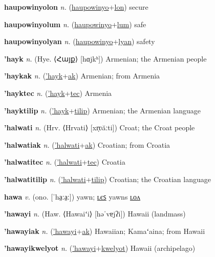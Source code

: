 \textbf{\hypertarget{haupowinyolon}{haupowinyolon}} \textit{n.} (\hyperlink{haupowinyo}{haupowinyo}+\allowbreak \hyperlink{lon}{lon})
secure

\textbf{\hypertarget{haupowinyolum}{haupowinyolum}} \textit{n.} (\hyperlink{haupowinyo}{haupowinyo}+\allowbreak \hyperlink{lum}{lum})
safe

\textbf{\hypertarget{haupowinyolyan}{haupowinyolyan}} \textit{n.} (\hyperlink{haupowinyo}{haupowinyo}+\allowbreak \hyperlink{lyan}{lyan})
safety

\textbf{\hypertarget{'hayk}{'hayk}} \textit{n.} (Hye. ⟨{\armenian{}Հայք}⟩ [hɑjkʰ])
Armenian; the Armenian people

\textbf{\hypertarget{'haykak}{'haykak}} \textit{n.} (\hyperlink{'hayk}{'hayk}+\allowbreak \hyperlink{ak}{ak})
Armenian; from Armenia

\textbf{\hypertarget{'hayktec}{'hayktec}} \textit{n.} (\hyperlink{'hayk}{'hayk}+\allowbreak \hyperlink{tec}{tec})
Armenia

\textbf{\hypertarget{'hayktilip}{'hayktilip}} \textit{n.} (\hyperlink{'hayk}{'hayk}+\allowbreak \hyperlink{tilip}{tilip})
Armenian; the Armenian language

\textbf{\hypertarget{'halwati}{'halwati}} \textit{n.} (Hrv. ⟨Hrvati⟩ [xr̩ʋăːti])
Croat; the Croat people

\textbf{\hypertarget{'halwatiak}{'halwatiak}} \textit{n.} (\hyperlink{'halwati}{'halwati}+\allowbreak \hyperlink{ak}{ak})
Croatian; from Croatia

\textbf{\hypertarget{'halwatitec}{'halwatitec}} \textit{n.} (\hyperlink{'halwati}{'halwati}+\allowbreak \hyperlink{tec}{tec})
Croatia

\textbf{\hypertarget{'halwatitilip}{'halwatitilip}} \textit{n.} (\hyperlink{'halwati}{'halwati}+\allowbreak \hyperlink{tilip}{tilip})
Croatian; the Croatian language

\textbf{\hypertarget{hawa}{hawa}} \textit{v.} (ono. [ˈha̤ːa̤ː])
yawn; \hyperlink{hawales}{ʟєꜱ} yawns \hyperlink{hawalon}{ʟᴏᴧ}

\textbf{\hypertarget{'hawayi}{'hawayi}} \textit{n.} (Haw. ⟨Hawaiʻi⟩ [həˈvɐjʔi])
Hawaii (landmass)

\textbf{\hypertarget{'hawayiak}{'hawayiak}} \textit{n.} (\hyperlink{'hawayi}{'hawayi}+\allowbreak \hyperlink{ak}{ak})
Hawaiian; Kamaʻaina; from Hawaii

\textbf{\hypertarget{'hawayikwelyot}{'hawayikwelyot}} \textit{n.} (\hyperlink{'hawayi}{'hawayi}+\allowbreak \hyperlink{kwelyot}{kwelyot})
Hawaii (archipelago)

